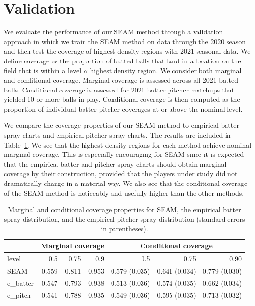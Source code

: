 \documentclass[12pt]{article}
\begin{document}
\section{Validation}

We evaluate the performance of our SEAM method through a validation approach in which we train the SEAM method on data through the 2020 season and then test the coverage of highest density regions with 2021 seasonal data. We define coverage as the proportion of batted balls that land in a location on the field that is within a level $\alpha$ highest density region. We consider both marginal and conditional coverage. Marginal coverage is assessed across all 2021 batted balls. Conditional coverage is assessed for 2021 batter-pitcher matchups that yielded 10 or more balls in play. Conditional coverage is then computed as the proportion of individual batter-pitcher coverages at or above the nominal level. 

We compare the coverage properties of our SEAM method to empirical batter spray charts and empirical pitcher spray charts. The results are included in Table~\ref{Tab:coverage}. We see that the highest density regions for each method achieve nominal marginal coverage. This is especially encouraging for SEAM since it is expected that the empirical batter and pitcher spray charts should obtain marginal coverage by their construction, provided that the players under study did not dramatically change in a material way. We also see that the conditional coverage of the SEAM method is noticeably and usefully higher than the other methods.



\begin{table}
\begin{center}
\begin{tabular}{l|rrr ||rrr }
  & \multicolumn{3}{c||}{Marginal coverage} & \multicolumn{3}{|c}{Conditional coverage} \\
  \hline
level  & 0.5 & 0.75 & 0.9 & 0.5 & 0.75 & 0.90 \\
\hline
SEAM & 0.559 & 0.811 & 0.953 & 0.579 (0.035) & 0.641 (0.034) & 0.779 (0.030) \\
e\_batter & 0.547 & 0.793 & 0.938 & 0.513 (0.036) & 0.574 (0.035) & 0.662 (0.034) \\
e\_pitch & 0.541 & 0.788 & 0.935 & 0.549 (0.036) & 0.595 (0.035) & 0.713 (0.032) \\
\end{tabular}		
\end{center}
\caption{Marginal and conditional coverage properties for SEAM, the empirical batter spray distribution, and the empirical pitcher spray distribution (standard errors in parentheses).  }
\label{Tab:coverage}
\end{table}
\end{document}
